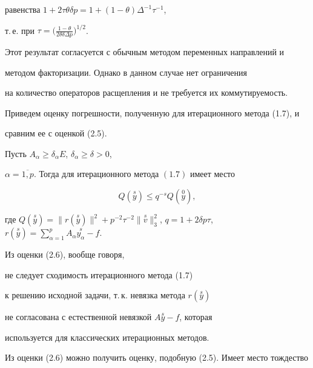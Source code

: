 равенства $1+2\tau\theta\delta p=1+(1-\theta)\Delta^{-1}\tau^{-1}$, 


т.\,е. при $\tau=\big(\frac{1-\theta}{2\theta\delta\Delta p}\big)^{1/2}$.


Этот результат согласуется с обычным методом переменных направлений и 


методом факторизации. Однако в данном случае нет ограничения 


на количество операторов расщепления и не требуется их коммутируемость.





Приведем оценку погрешности, полученную для итерационного метода (1.7), и 


сравним ее с оценкой (2.5).





\begin{thms}


Пусть $A_\alpha\ge\delta_\alpha E$, $\delta_\alpha\ge\delta>0$,


$\alpha=\overline {1,p}$. Тогда для итерационного метода $(1.7)$ имеет место


\begin{equation}


Q(\overset {s}{y})\le q^{-s}Q(\overset {0}{y}),


\end{equation}


где $Q(\overset {s}{y})=\|r(\overset {s}{y})\|^2+p^{-2}\tau^{-2}


\|\overset {s}{v}\|_3^2$, $q=1+2\delta p\tau$, $r(\overset {s}{y})=


\sum\limits_{\alpha=1}^p A_\alpha \overset {s}{ y_\alpha}-f$.


\end{thms}





Из оценки (2.6), вообще говоря, 


не следует сходимость итерационного метода (1.7)


к решению исходной задачи, т.\,к. невязка метода $r(\overset {s}{y})$


не согласована с естественной невязкой $A \overset{s}{y}-f$, которая 


используется для классических итерационных методов. 


Из оценки (2.6) можно получить оценку, подобную (2.5). Имеет место тождество


